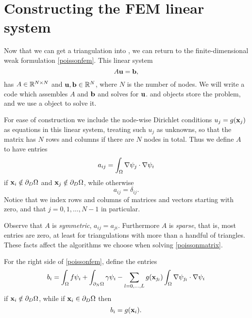 

\section{Constructing the FEM linear system}

Now that we can get a triangulation into \PETSc, we can return to the finite-dimensional weak formulation \eqref{poissonfem}.  This linear system
\begin{equation}
A \mathbf{u} = \mathbf{b}, \label{poissonmatrix}
\end{equation}
has $A\in\mathbb{R}^{N\times N}$ and $\mathbf{u},\mathbf{b}\in\mathbb{R}^N$, where $N$ is the number of nodes.  We will write a code which assembles $A$ and $\mathbf{b}$ and solves for $\mathbf{u}$.  \PETSc \pMat and \pVec objects store the problem, and we use a \pKSP object to solve it.

For ease of construction we include the node-wise Dirichlet conditions $u_j=g(\mathbf{x}_j)$ as equations in this linear system, treating such $u_j$ as unknowns, so that the matrix has $N$ rows and columns if there are $N$ nodes in total.  Thus we define $A$ to have entries
\begin{equation}
a_{ij} = \int_\Omega \nabla \psi_j \cdot \nabla \psi_i \label{Aentryfem}
\end{equation}
if $\mathbf{x}_i \notin \partial_D \Omega$ and $\mathbf{x}_j \notin \partial_D \Omega$, while otherwise
\begin{equation*}
a_{ij} = \delta_{ij}.
\end{equation*}
Notice that we index rows and columns of matrices and vectors starting with zero, and that $j=0,1,\dots,N-1$ in particular.

Observe that $A$ is \emph{symmetric}, $a_{ij}=a_{ji}$.  Furthermore $A$ is \emph{sparse}, that is, most entries are zero, at least for triangulations with more than a handful of triangles.  These facts affect the algorithms we choose when solving \eqref{poissonmatrix}.

For the right side of \eqref{poissonfem}, define the entries
\begin{equation}
    b_i = \int_\Omega f \psi_i + \int_{\partial_N\Omega} \gamma \psi_i - \sum_{l=0,\dots,L} g(\mathbf{x}_{j_l})  \int_\Omega \nabla \psi_{j_l} \cdot \nabla \psi_i  \label{bentryfem}
\end{equation}
if $\mathbf{x}_i \notin \partial_D \Omega$, while if $\mathbf{x}_i \in \partial_D \Omega$ then
    $$b_i = g(\mathbf{x}_{i}).$$

